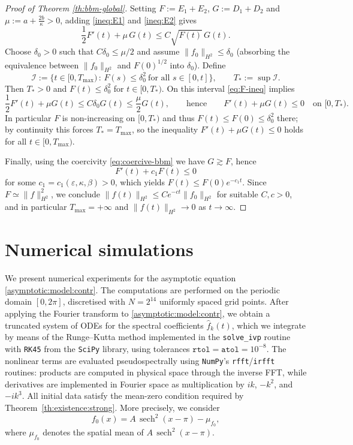 \documentclass[reqno]{amsart}
\theoremstyle{definition}
\numberwithin{equation}{section}
\numberwithin{theorem}{section}
\numberwithin{definition}{section}
\begin{document}
\begin{proof}[Proof of Theorem \ref{th:bbm-global}]
	Setting $F:=E_1+E_2$, $G:=D_1+D_2$ and $\mu:=a+\frac{2b}{\kappa}>0$, adding \eqref{ineq:E1} and \eqref{ineq:E2} gives
	\begin{equation}\label{eq:F-ineq}
		\frac12 F'(t)+\mu\,G(t)\le C\sqrt{F(t)}\,G(t).
	\end{equation}
	Choose $\delta_0>0$ such that $C\delta_0\le \mu/2$ and assume $\|f_0\|_{H^2}\le\delta_0$ (absorbing the equivalence between
	$\|f_0\|_{H^2}$ and $F(0)^{1/2}$ into $\delta_0$). Define
	\[
	\mathcal{I}:=\Big\{t\in[0,T_{\max})\,:\,F(s)\le \delta_0^2\ \text{for all }s\in[0,t]\Big\},\qquad
	T_*:=\sup\mathcal{I}.
	\]
	Then $T_*>0$ and $F(t)\le \delta_0^2$ for $t\in[0,T_*)$. On this interval \eqref{eq:F-ineq} implies
	\[
	\frac12 F'(t)+\mu G(t)\le C\delta_0 G(t)\le \frac{\mu}{2}G(t),
	\qquad\text{hence}\qquad
	F'(t)+\mu G(t)\le 0 \quad \text{on }[0,T_*).
	\]
	In particular $F$ is non-increasing on $[0,T_*)$ and thus $F(t)\le F(0)\le \delta_0^2$ there; by continuity this forces
	$T_*=T_{\max}$, so the inequality $F'(t)+\mu G(t)\le 0$ holds for all $t\in[0,T_{\max})$.
	
	Finally, using the coercivity \eqref{eq:coercive-bbm} we have $G\gtrsim F$, hence
	\[
	F'(t)+c_1 F(t)\le 0
	\]
	for some $c_1=c_1(\varepsilon,\kappa,\beta)>0$, which yields $F(t)\le F(0)e^{-c_1 t}$. Since $F\simeq \|f\|_{H^2}^2$,
	we conclude $\|f(t)\|_{H^2}\le C e^{-ct}\|f_0\|_{H^2}$ for suitable $C,c>0$, and in particular $T_{\max}=+\infty$ and
	$\|f(t)\|_{H^2}\to 0$ as $t\to\infty$.
\end{proof}
	
\section{Numerical simulations}\label{sec:numerical}

We present numerical experiments for the asymptotic equation \eqref{asymptotic:model:contr}.
The computations are performed on the periodic domain $[0,2\pi]$, discretised with
$N=2^{14}$ uniformly spaced grid points.
After applying the Fourier transform to \eqref{asymptotic:model:contr}, we obtain a truncated system of
ODEs for the spectral coefficients $\widehat{f}_k(t)$, which we integrate by means of the Runge--Kutta method implemented in the \texttt{solve\_ivp} routine with \texttt{RK45} from the \texttt{SciPy} library, using tolerances
$\texttt{rtol}=\texttt{atol}=10^{-8}$.
The nonlinear terms are evaluated pseudospectrally using \texttt{NumPy}'s
\texttt{rfft}/\texttt{irfft} routines: products are computed in physical
space through the inverse FFT, while derivatives are implemented in Fourier space as multiplication by $ik$, $-k^2$, and $-ik^3$.
All initial data satisfy the mean-zero condition required by Theorem~\ref{th:existence:strong}. More precisely, we consider
\[
f_0(x)=A\,\operatorname{sech}^2(x-\pi)-\mu_{f_0},
\]
where $\mu_{f_0}$ denotes the spatial mean of $A\,\operatorname{sech}^2(x-\pi)$. \medskip
\end{document}

